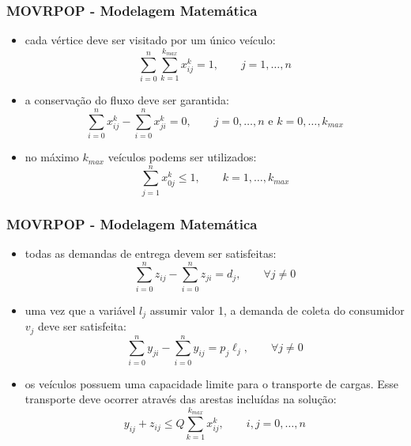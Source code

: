 \documentclass{beamer}
\begin{document}
\begin{frame}
 \frametitle{MOVRPOP - Modelagem Matemática}
 \begin{itemize}
 \item cada vértice deve ser visitado por um único veículo:
\begin{equation}
\label{eq:modelagem_3}
\sum^{n}_{i=0}\sum^{k_{max}}_{k=1}x^{k}_{ij} = 1, \qquad j = 1,\ldots,n
\end{equation}

\item a conservação do fluxo deve ser garantida: 
\begin{equation}
\label{eq:modelagem_4}
\sum^{n}_{i=0}x^{k}_{ij} - \sum^{n}_{i=0}x^{k}_{ji} = 0, \qquad j = 0,\ldots,n \textrm{ e } k = 0,\ldots,k_{max}
\end{equation}

\item no máximo $k_{max}$ veículos podems ser utilizados:
\begin{equation}
\label{eq:modelagem_5}
\sum^{n}_{j=1}x^{k}_{0j} \leq 1, \qquad k = 1,\ldots,k_{max}
\end{equation}
  \end{itemize}

\end{frame}

\begin{frame}
 \frametitle{MOVRPOP - Modelagem Matemática}
 \begin{itemize}
 \item todas as demandas de entrega devem ser satisfeitas:
\begin{equation}
\label{eq:modelagem_6}
\sum^{n}_{i=0}z_{ij} - \sum^{n}_{i=0}z_{ji} = d_{j}, \qquad \forall j \neq 0
\end{equation}

\item uma vez que a variável $l_j$ assumir valor 1, a demanda de coleta do consumidor $v_j$ deve ser satisfeita:
\begin{equation}
\label{eq:modelagem_61}
\sum^{n}_{i=0}y_{ji} - \sum^{n}_{i=0}y_{ij} = p_j \ell_j, \qquad \forall j \neq 0
\end{equation}

\item os veículos possuem uma capacidade limite para o transporte de cargas. Esse transporte deve ocorrer através das arestas incluídas na solução:
\begin{equation}
\label{eq:modelagem_7}
y_{ij} + z_{ij} \leq Q \sum^{k_{max}}_{k=1}x^{k}_{ij}, \qquad i, j = 0,\ldots,n
\end{equation}
  \end{itemize}

\end{frame}
\end{document}
